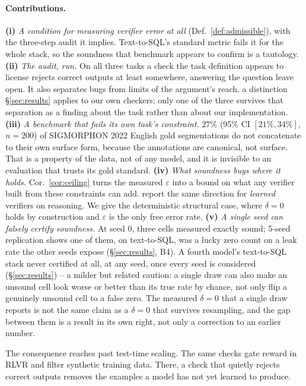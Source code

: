 \documentclass[11pt]{article}
\begin{document}
\paragraph{Contributions.} \textbf{(i)} \emph{A condition for measuring verifier
error at all} (Def.~\ref{def:admissible}), with the three-step audit it implies.
Text-to-SQL's standard metric fails it for the whole stack, so the soundness
that benchmark appears to confirm is a tautology. \textbf{(ii)} \emph{The audit, run.} On all three tasks a check the task
definition appears to license rejects correct outputs at least somewhere,
answering the question
\citet{stroebl2024verifier} leave open. It also separates bugs from limits of the argument's reach, a distinction
\S\ref{sec:results} applies to our own checkers: only one of the three
survives that separation as a finding about the task rather than about our
implementation.
\textbf{(iii)} \emph{A benchmark that fails its own task's constraint.} $27\%$ (95\% CI $[21\%,34\%]$, $n{=}200$) of
SIGMORPHON 2022 English gold segmentations do not concatenate to their own
surface form, because the annotations are canonical, not surface. That is
a property of the data, not of any model, and it is invisible to an evaluation
that trusts its gold standard. \textbf{(iv)} \emph{What soundness buys where it
holds.} Cor.~\ref{cor:ceiling} turns the measured $\varepsilon$ into a bound on
what any verifier built from these constraints can add.
\citet{variationverif2026} report the same direction for \emph{learned}
verifiers on reasoning. We give the deterministic structural case, where
$\delta=0$ holds by construction and $\varepsilon$ is the only free error rate.
\textbf{(v)} \emph{A single seed can falsely certify soundness.} At seed
0, three cells measured exactly sound; 5-seed replication shows one of
them, on text-to-SQL, was a lucky
zero count on a leak rate the other seeds expose (\S\ref{sec:results},
B4). A fourth model's text-to-SQL stack never certified at all, at any
seed, once every seed is considered (\S\ref{sec:results}) -- a milder but
related caution: a single draw can also make an unsound cell look worse
or better than its true rate by chance, not only flip a genuinely
unsound cell to a false zero. The measured $\delta=0$ that a single draw
reports is not the same claim as a $\delta=0$ that survives resampling,
and the gap between them is a result in its own right, not only a
correction to an earlier number.

The consequence reaches past test-time scaling. The same checks gate reward in
RLVR and filter synthetic training data. There, a check that quietly rejects
correct outputs removes the examples a model has not yet learned to produce.
\end{document}
